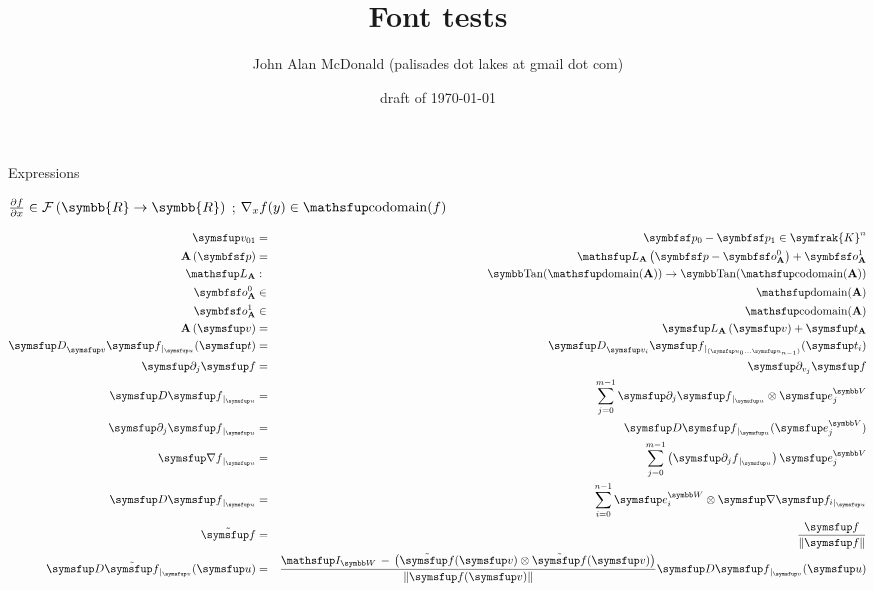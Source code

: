 \documentclass[12pt]{PalisadesLakesArticle}
\title{Font tests}
\author{John Alan McDonald 
(palisades dot lakes at gmail dot com)}
\date{draft of \today}
\begin{document}
\def\sharedFolder{../shared/}

\begin{plSection}{Expressions}

$
\frac{\partial f}{\partial x} 
\in \mathcal{F}\left(\symbb{R} \rightarrow \symbb{R}\right)$
;
$\nabla_{x} f (y) \in \codomain ( f )$

\begin{eqnarray}
\Vector{v_{01}} & = & \Point{p}_{0} - \Point{p}_{1} \in \symfrak{K}^n
\\
\Affine{A} \left( \Point{p} \right)
& = & 
\Linear{L}_{\Affine{A}} 
\left( 
\Point{p} - \Point{o}_{\Affine{A}}^{0}
 \right) 
+ 
\Point{o}_{\Affine{A}}^{1}
\\
\Linear{L}_{\Affine{A}} & : &\TangentSpace(\domain(\Affine{A}))
\rightarrow \TangentSpace(\codomain(\Affine{A}))
\\
\Point{o}_{\Affine{A}}^{0} & \in & \domain(\Affine{A})
\\
\Point{o}_{\Affine{A}}^{1} & \in & \codomain(\Affine{A})
\\
\Affine{A} \left( \Vector{v} \right)
& = & 
\Vector{L}_{\Affine{A}} \left( \Vector{v} \right)
+ \Vector{t}_{\Affine{A}} 
\\
\Derivative[\Vector{v}]{\Vector{f}}[\Vector{u}][\Vector{t}]
& = &
\Derivative[\Vector{v}_i]{\Vector{f}}
[(\Vector{u}_0 \ldots \Vector{u}_{n-1})][\Vector{t}_i] 
\\
\Partial{j}{\Vector{f}} & = &\Partial{v_j}{\Vector{f}} 
\\
\Derivative{\Vector{f}}[\Vector{u}]
& = &
\sum_{j=0}^{m-1} \Partial{j}{\Vector{f}}[\Vector{u}] 
\otimes \Vector{e}_j^{\Space{V}}
\\
\Partial{j}{\Vector{f}}[\Vector{u}]
& = &
\Derivative{\Vector{f}}[\Vector{u}] [\Vector{e}_j^{\Space{V}}]
\\
\Gradient{f}[\Vector{u}] 
& = &
\sum_{j=0}^{m-1} 
\left( 
\Partial{j}{f}[\Vector{u}] 
\right) \Vector{e}_j^{\Space{V}}
\\
\Derivative{\Vector{f}}[\Vector{u}]
& = &
 \sum_{i=0}^{n-1}  
\Vector{e}_i^{\Space{W}} 
\otimes \Gradient{\Vector{f}_i}[\Vector{u}]
\\
\tilde{\Vector{f}}  
& = &
\frac{\Vector{f}}{\| \Vector{f} \|}
\\
\Derivative{\tilde{\Vector{f}}}[\Vector{v}][\Vector{u}]
& = &
\frac{\Identity_{\Space{W}} 
\,-\, 
\left( 
\tilde{\Vector{f}}(\Vector{v})
 \otimes 
 \tilde{\Vector{f}}(\Vector{v}) \right)  
 }
{\| \Vector{f}(\Vector{v}) \|}
\Derivative{\Vector{f}}[\Vector{v}][\Vector{u}] 
\end{eqnarray}



\end{plSection}
\end{document}
